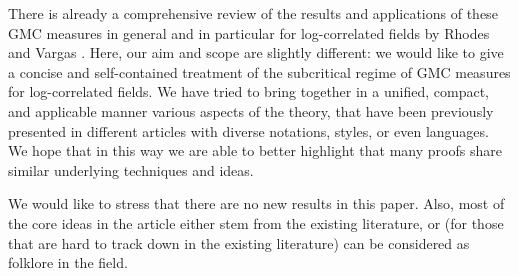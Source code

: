 \documentclass[11pt]{amsart}
\renewcommand{\1}{\mathbf 1}
\begin{document}
There is already a comprehensive review of the results and applications of these GMC measures in general and in particular for log-correlated fields by Rhodes and Vargas \cite{RVrev}. Here, our aim and scope are slightly different: we would like to give a concise and self-contained treatment of the subcritical regime of GMC measures for log-correlated fields. We have tried to bring together in a unified, compact, and applicable manner various aspects of the theory, that have been previously presented in different articles with diverse notations, styles, or even languages. We hope that in this way we are able to better highlight that many proofs share similar underlying techniques and ideas. 

We would like to stress that there are no new results in this paper. Also, most of the core ideas in the article either stem from the existing literature, or (for those that are hard to track down in the existing literature) can be considered as folklore in the field. 
\end{document}
